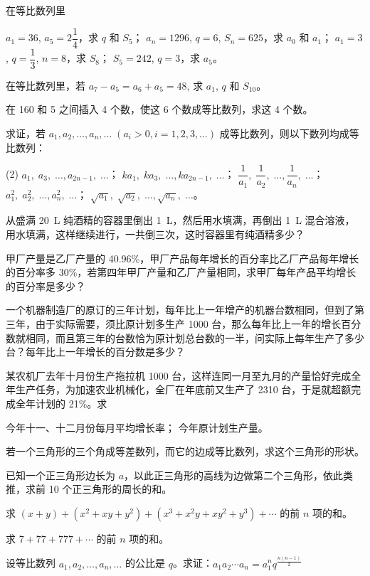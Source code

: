 \begin{Exercise}
\begin{question}
\item 在等比数列里
\begin{tasks}
  \task $a_1=36$, $a_5=2\dfrac{1}{4}$，求 $q$ 和 $S_5$；
  \task $a_n=1296$, $q=6$, $S_n=625$，求 $a_0$ 和 $a_1$；
  \task $a_1=3$, $q=\dfrac{1}{3}$, $n=8$，求 $S_8$；
  \task $S_5=242$, $q=3$，求 $a_5$。
\end{tasks}
\item 在等比数列里，若 $a_7-a_5=a_6+a_5=48$, 求 $a_1$, $q$ 和 $S_{10}$。
\item 在 160 和 5 之间插入 4 个数，使这 6 个数成等比数列，求这 4 个数。
\item 求证，若 $a_1,a_2,\ldots,a_n,\ldots\; (a_i>0,i=1,2,3,\ldots)$ 成等比数列，则以下数列均成等比数列：
\begin{tasks}(2)
  \task $a_1,\; a_3,\; \ldots, a_{2n-1},\; \ldots$；
  \task $ka_1,\; ka_3,\; \ldots, ka_{2n-1},\; \ldots$；
  \task $\dfrac{1}{a_1},\; \dfrac{1}{a_2},\; \ldots, \dfrac{1}{a_{n}},\; \ldots$；
  \task $a^2_1,\; a^2_2,\; \ldots, a^2_{n},\; \ldots$；
  \task $\sqrt{a_1},\; \sqrt{a_2},\; \ldots, \sqrt{a_n},\; \ldots$。
\end{tasks}

\item 从盛满 \qty{20}{L} 纯酒精的容器里倒出 \qty{1}{L}，然后用水填满，再倒出 \qty{1}{L} 混合溶液，用水填满，这样继续进行，一共倒三次，这时容器里有纯酒精多少？
\item 甲厂产量是乙厂产量的 40.96\%，甲厂产品每年增长的百分率比乙厂产品每年增长的百分率多 30\%，若第四年甲厂产量和乙厂产量相同，求甲厂每年产品平均增长的百分率是多少？
\item 一个机器制造厂的原订的三年计划，每年比上一年增产的机器台数相同，但到了第三年，由于实际需要，须比原计划多生产 1000 台，那么每年比上一年的增长百分数就相同，而且第三年的台数恰为原计划总台数的一半，问实际上每年生产了多少台？每年比上一年增长的百分数是多少？
\item 某农机厂去年十月份生产拖拉机 1000 台，这样连同一月至九月的产量恰好完成全年生产任务，为加速农业机械化，全厂在年底前又生产了 2310 台，于是就超额完成全年计划的 21\%。求
\begin{tasks}
  \task 今年十一、十二月份每月平均增长率；
  \task 今年原计划生产量。
\end{tasks}

\item 若一个三角形的三个角成等差数列，而它的边成等比数列，求这个三角形的形状。
\item 已知一个正三角形边长为 $a$，以此正三角形的高线为边做第二个三角形，依此类推，求前 10 个正三角形的周长的和。
\item 求 $(x+y)+(x^2+xy+y^2)+(x^3+x^2y+xy^2+y^3)+\cdots$ 的前 $n$ 项的和。
\item 求 $7+77+777+\cdots$ 的前 $n$ 项的和。
\item 设等比数列 $a_1,a_2,\ldots,a_n,\ldots$ 的公比是 $q$。求证：$a_1a_2\cdots a_n=a^n_1q^{\tfrac{n(n-1)}{2}}$


\end{question}
\end{Exercise}
